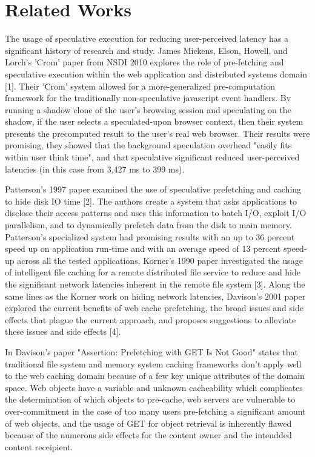 \section{Related Works}
\label{sec:related}
The usage of speculative execution for reducing user-perceived latency has a significant history of research and study.  James Mickens, Elson, Howell, and Lorch's 
'Crom' paper from NSDI 2010 explores the role of pre-fetching and speculative execution within the web application and distributed systems domain [1]. Their 'Crom' system allowed for a more-generalized pre-computation framework for the traditionally non-speculative javascript event handlers. By running a shadow clone of the user's browsing session and speculating on the shadow, if the user selects a speculated-upon browser context, then their system presents the precomputed result to the user's real web browser. Their results were promising, they showed that the background speculation overhead "easily fits within user think time", and that  speculative significant reduced user-perceived latencies (in this case from 3,427 ms to 399 ms).

Patterson's 1997 paper examined the use of speculative prefetching and caching to hide disk IO time [2]. The authors create a system that asks applications to disclose their access patterns and uses this information to batch I/O, exploit I/O parallelism, and to dynamically prefetch data from the disk to main memory. Patterson's specialized system had promising results with an up to 36 percent speed up on application run-time and with an average speed of 13 percent speed-up across all the tested applications. Korner's 1990 paper investigated the usage of intelligent file caching for a remote distributed file service to reduce and hide the significant network latencies inherent in the remote file system [3]. Along the same lines as the Korner work on hiding network latencies, Davison's 2001 paper explored the current benefits of web cache prefetching, the broad issues and side effects that plague the current approach, and proposes suggestions to alleviate these issues and side effects [4].

In Davison's paper "Assertion: Prefetching with GET Is Not Good" states that traditional file system and memory system caching frameworks don't apply well to the web caching domain because of a few key unique attributes of the domain space. Web objects have a variable and unknown cacheability which complicates the determination of which objects to pre-cache, web servers are vulnerable to over-commitment in the case of too many users pre-fetching a significant amount of web objects, and the usage of GET for object retrieval is inherently flawed because of the numerous side effects for the content owner and the intendded content receipient.

